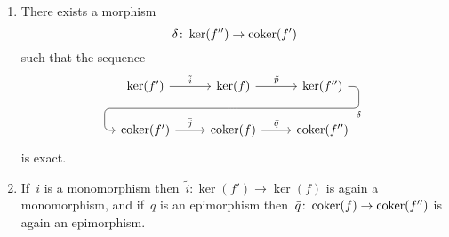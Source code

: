 \begin{lemma}
  \begin{enumerate}
    \item
      There exists a morphism
      \[
                \delta
        \colon  \ker(f'')
        \to     \operatorname{coker}(f')
      \]
      such that the sequence
      \begin{equation}
        \label{induced snake}
        \begin{tikzcd}
            \ker(f')
            \arrow{r}[above]{\tilde{i}}
          & \ker(f)
            \arrow{r}[above]{\tilde{p}}
            \arrow[d, phantom, ""{coordinate, name=Z}]
          & \ker(f'')
            \arrow[ dll,
                    "\delta",
                    rounded corners,
                    to path={ -- ([xshift=2ex]\tikztostart.east)
                              |- (Z) \tikztonodes
                              -| ([xshift=-2ex]\tikztotarget.west)
                              -- (\tikztotarget)}
                  ]
          \\
            \coker(f')
            \arrow{r}[above]{\bar{j}}
          & \coker(f)
            \arrow{r}[above]{\bar{q}}
          & \coker(f'')
        \end{tikzcd}
      \end{equation}
      is exact.
    \item
      \label{snake inherits mono epi}
      If~$i$ is a monomorphism then~$\tilde{i} \colon \ker(f') \to \ker(f)$ is again a monomorphism, and if~$q$ is an epimorphism then~$\bar{q} \colon \operatorname{coker}(f) \to \operatorname{coker}(f'')$ is again an epimorphism.
  \end{enumerate}
\end{lemma}


